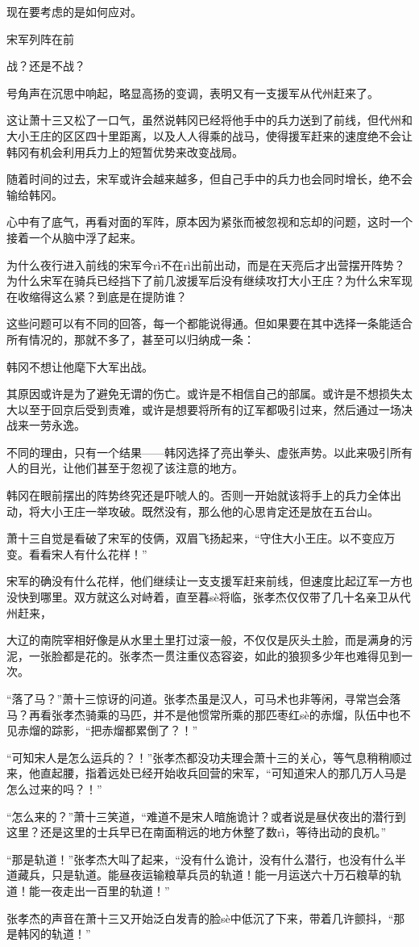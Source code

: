 现在要考虑的是如何应对。

宋军列阵在前

战？还是不战？

号角声在沉思中响起，略显高扬的变调，表明又有一支援军从代州赶来了。

这让萧十三又松了一口气，虽然说韩冈已经将他手中的兵力送到了前线，但代州和大小王庄的区区四十里距离，以及人人得乘的战马，使得援军赶来的速度绝不会让韩冈有机会利用兵力上的短暂优势来改变战局。

随着时间的过去，宋军或许会越来越多，但自己手中的兵力也会同时增长，绝不会输给韩冈。

心中有了底气，再看对面的军阵，原本因为紧张而被忽视和忘却的问题，这时一个接着一个从脑中浮了起来。

为什么夜行进入前线的宋军今rì不在rì出前出动，而是在天亮后才出营摆开阵势？为什么宋军在骑兵已经挡下了前几波援军后没有继续攻打大小王庄？为什么宋军现在收缩得这么紧？到底是在提防谁？

这些问题可以有不同的回答，每一个都能说得通。但如果要在其中选择一条能适合所有情况的，那就不多了，甚至可以归纳成一条：

韩冈不想让他麾下大军出战。

其原因或许是为了避免无谓的伤亡。或许是不相信自己的部属。或许是不想损失太大以至于回京后受到责难，或许是想要将所有的辽军都吸引过来，然后通过一场决战来一劳永逸。

不同的理由，只有一个结果——韩冈选择了亮出拳头、虚张声势。以此来吸引所有人的目光，让他们甚至于忽视了该注意的地方。

韩冈在眼前摆出的阵势终究还是吓唬人的。否则一开始就该将手上的兵力全体出动，将大小王庄一举攻破。既然没有，那么他的心思肯定还是放在五台山。

萧十三自觉是看破了宋军的伎俩，双眉飞扬起来，“守住大小王庄。以不变应万变。看看宋人有什么花样！”

宋军的确没有什么花样，他们继续让一支支援军赶来前线，但速度比起辽军一方也没快到哪里。双方就这么对峙着，直至暮sè将临，张孝杰仅仅带了几十名亲卫从代州赶来，

大辽的南院宰相好像是从水里土里打过滚一般，不仅仅是灰头土脸，而是满身的污泥，一张脸都是花的。张孝杰一贯注重仪态容姿，如此的狼狈多少年也难得见到一次。

“落了马？”萧十三惊讶的问道。张孝杰虽是汉人，可马术也非等闲，寻常岂会落马？再看张孝杰骑乘的马匹，并不是他惯常所乘的那匹枣红sè的赤熘，队伍中也不见赤熘的踪影，“把赤熘都累倒了？！”

“可知宋人是怎么运兵的？！”张孝杰都没功夫理会萧十三的关心，等气息稍稍顺过来，他直起腰，指着远处已经开始收兵回营的宋军，“可知道宋人的那几万人马是怎么过来的吗？！”

“怎么来的？”萧十三笑道，“难道不是宋人暗施诡计？或者说是昼伏夜出的潜行到这里？还是这里的士兵早已在南面稍远的地方休整了数rì，等待出动的良机。”

“那是轨道！”张孝杰大叫了起来，“没有什么诡计，没有什么潜行，也没有什么半道藏兵，只是轨道。能昼夜运输粮草兵员的轨道！能一月运送六十万石粮草的轨道！能一夜走出一百里的轨道！”

张孝杰的声音在萧十三又开始泛白发青的脸sè中低沉了下来，带着几许颤抖，“那是韩冈的轨道！”
